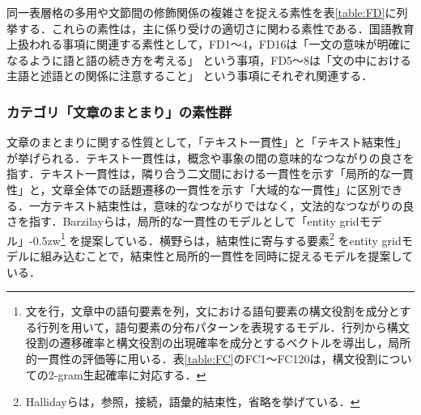 \documentclass[japanese]{jnlp_1.5}
\let\underline
\newenvironment{indent1zw}{}{}
\begin{document}
同一表層格の多用や文節間の修飾関係の複雑さを捉える素性を表\ref{table:FD}に列挙する．これらの素性は，主に係り受けの適切さに関わる素性である．国語教育上扱われる事項に関連する素性として，FD1〜4，FD16は「一文の意味が明確になるように語と語の続き方を考える」
\cite{MonbuKagakuSho2008}
という事項，FD5〜8は「文の中における主語と述語との関係に注意すること」\cite{MonbuKagakuSho2008}
という事項にそれぞれ関連する．



\subsubsection{カテゴリ「文章のまとまり」の素性群}

文章のまとまりに関する性質として，「テキスト一貫性」\cite{TakuboEtc2004}と「テキスト結束性」\cite{HallidayHasan1976}が挙げられる．テキスト一貫性は，概念や事象の間の意味的なつながりの良さを指す．テキスト一貫性は，隣り合う二文間における一貫性を示す「局所的な一貫性」と，文章全体での話題遷移の一貫性を示す「大域的な一貫性」に区別できる．一方テキスト結束性は，意味的なつながりではなく，文法的なつながりの良さを指す．Barzilayら\cite{BarzilayLapata2008}は，局所的な一貫性のモデルとして「entity gridモデル」{\kern-0.5zw}\footnote{
	文を行，文章中の語句要素を列，文における語句要素の構文役割を成分とする行列を用いて，語句要素の分布パターンを表現するモデル．行列から構文役割の遷移確率と構文役割の出現確率を成分とするベクトルを導出し，局所的一貫性の評価等に用いる．表\ref{table:FC}のFC1〜FC120は，構文役割についての2-gram生起確率に対応する．}
を提案している．横野ら\cite{YokonoOkumura2010}は，結束性に寄与する要素\footnote{
	Hallidayら\cite{HallidayHasan1976}は，参照，接続，語彙的結束性，省略を挙げている．}
をentity gridモデルに組み込むことで，結束性と局所的一貫性を同時に捉えるモデルを提案している．
\end{document}
